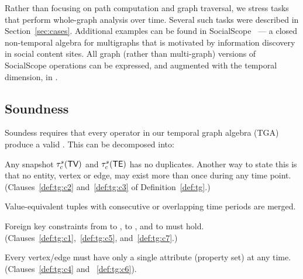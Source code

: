 Rather than focusing on path computation and graph traversal, we
stress tasks that perform whole-graph analysis over time.  Several
such tasks were described in Section~\ref{sec:cases}.  Additional
examples can be found in SocialScope~\cite{Amer-Yahia2009} --- a
closed non-temporal algebra for multigraphs that is motivated by
information discovery in social content sites.  All graph (rather than
multi-graph) versions of SocialScope operations can be expressed, and
augmented with the temporal dimension, in \tga.

\subsection{Soundness}
\label{sec:algebra:integrity}


Soundess requires that every operator in our temporal graph algebra
(TGA) produce a valid \tg.  This can be decomposed into:

\begin{description}[noitemsep]

\item [R1: Duplicates] Any snapshot $\tau^s_c (\textsf{TV})$ and $\tau^s_c
  (\textsf{TE})$ has no duplicates.  Another way to state this is that no
  entity, vertex or edge, may exist more than once during any time
  point. (Clauses~\ref{def:tg:c2} and~\ref{def:tg:c3} of
  Definition~\ref{def:tg}.)

\item [R2: Coalesced] Value-equivalent tuples with
  consecutive or overlapping time periods are merged.

\item [R3: Foreign key constraint] Foreign key constraints from \tav
  to \tv, \tae to \te, and \te to \tv must
  hold. (Clauses~\ref{def:tg:c1},~\ref{def:tg:c5},
  and~\ref{def:tg:c7}.)

\item [R4: Single attribute] Every vertex/edge must have only a single
  attribute (property set) at any time. (Clauses~\ref{def:tg:c4} and
  ~\ref{def:tg:c6}).
\end{description}
\vspace{-1ex}

